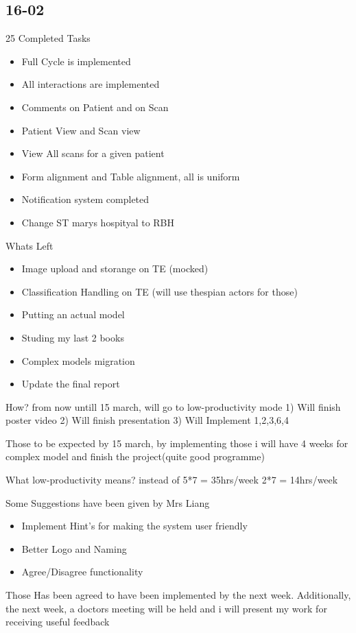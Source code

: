 \documentclass[openany]{article}
\begin{document}
		\subsection{16-02}
			25 Completed Tasks
			\begin{itemize}
				\item Full Cycle is implemented
				\item All interactions are implemented
				\item Comments on Patient and on Scan
				\item Patient View and Scan view
				\item View All scans for a given patient
				\item Form alignment and Table alignment, all is uniform 
				\item Notification system completed
				\item Change ST marys hospityal to RBH
			\end{itemize}
			Whats Left
			\begin{itemize}
				\item Image upload and storange on TE (mocked)
				\item Classification Handling on TE (will use thespian actors for those)
				\item Putting an actual model
				\item Studing my last 2 books
				\item Complex models migration
				\item Update the final report
			\end{itemize}
			
			How? 
			from now untill 15 march, will go to low-productivity mode
			1) Will finish poster video
			2) Will finish presentation
			3) Will Implement 1,2,3,6,4
			
			Those to be expected by 15 march, by implementing those i will have 4 weeks for 
			complex model and finish the project(quite good programme)
			
			What low-productivity means?
			instead of 5*7 = 35hrs/week
			2*7 = 14hrs/week
			
			Some Suggestions have been given by Mrs Liang
			\begin{itemize}
				\item Implement Hint's for making the system user friendly
				\item Better Logo and Naming
				\item Agree/Disagree functionality
			\end{itemize}
			Those Has been agreed to have been implemented by the next week.
			Additionally, the next week, a doctors meeting will be held and i will present my work for receiving useful feedback
\end{document}
